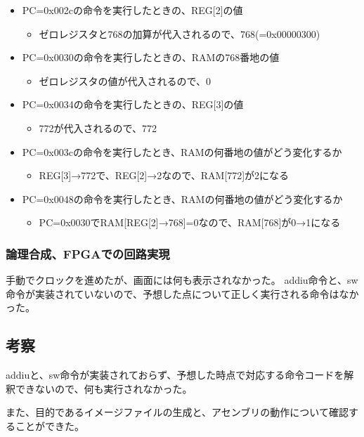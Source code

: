 \begin{itemize}
  \item PC=0x002cの命令を実行したときの、REG[2]の値
  \begin{itemize}
    \item ゼロレジスタと768の加算が代入されるので、768(=0x00000300)
  \end{itemize}
  \item PC=0x0030の命令を実行したときの、RAMの768番地の値
  \begin{itemize}
    \item ゼロレジスタの値が代入されるので、0
  \end{itemize}
  \item PC=0x0034の命令を実行したときの、REG[3]の値
  \begin{itemize}
    \item 772が代入されるので、772
  \end{itemize}
  \item PC=0x003cの命令を実行したとき、RAMの何番地の値がどう変化するか
  \begin{itemize}
    \item REG[3]→772で、REG[2]→2なので、RAM[772]が2になる
  \end{itemize}
  \item PC=0x0048の命令を実行したとき、RAMの何番地の値がどう変化するか
  \begin{itemize}
    \item PC=0x0030でRAM[REG[2]→768]=0なので、RAM[768]が0→1になる
  \end{itemize}
\end{itemize}

\subsubsection{論理合成、FPGAでの回路実現}
手動でクロックを進めたが、画面には何も表示されなかった。
addiu命令と、sw命令が実装されていないので、予想した点について正しく実行される命令はなかった。

\subsection{考察}
addiuと、sw命令が実装されておらず、予想した時点で対応する命令コードを解釈できないので、何も実行されなかった。

また、目的であるイメージファイルの生成と、アセンブリの動作について確認することができた。
